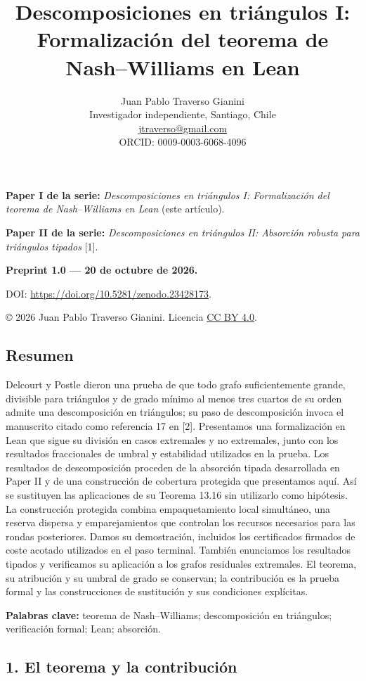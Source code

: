 \documentclass[spanish,11pt,a4paper]{article}
\title{Descomposiciones en triángulos I: Formalización del teorema de Nash–Williams en Lean}
\author{Juan Pablo Traverso Gianini\\
\small Investigador independiente, Santiago, Chile\\
\small \href{mailto:jtraverso@gmail.com}{jtraverso@gmail.com}\\
\small ORCID: 0009-0003-6068-4096}
\date{}
\begin{document}
\raggedbottom
\maketitle
\textbf{Paper I de la serie:} \emph{Descomposiciones en triángulos I: Formalización del teorema de Nash--Williams en Lean} (este artículo).

\textbf{Paper II de la serie:} \emph{Descomposiciones en triángulos II: Absorción robusta para triángulos tipados} {[}1{]}.

\textbf{Preprint 1.0 --- 20 de octubre de 2026.}

DOI: \url{https://doi.org/10.5281/zenodo.23428173}.

© 2026 Juan Pablo Traverso Gianini. Licencia \href{https://creativecommons.org/licenses/by/4.0/}{CC BY 4.0}.

\subsection{Resumen}\label{resumen}

Delcourt y Postle dieron una prueba de que todo grafo suficientemente grande, divisible para triángulos y de grado mínimo al menos tres cuartos de su orden admite una descomposición en triángulos; su paso de descomposición invoca el manuscrito citado como referencia 17 en {[}2{]}. Presentamos una formalización en Lean que sigue su división en casos extremales y no extremales, junto con los resultados fraccionales de umbral y estabilidad utilizados en la prueba. Los resultados de descomposición proceden de la absorción tipada desarrollada en Paper II y de una construcción de cobertura protegida que presentamos aquí. Así se sustituyen las aplicaciones de su Teorema 13.16 sin utilizarlo como hipótesis. La construcción protegida combina empaquetamiento local simultáneo, una reserva dispersa y emparejamientos que controlan los recursos necesarios para las rondas posteriores. Damos su demostración, incluidos los certificados firmados de coste acotado utilizados en el paso terminal. También enunciamos los resultados tipados y verificamos su aplicación a los grafos residuales extremales. El teorema, su atribución y su umbral de grado se conservan; la contribución es la prueba formal y las construcciones de sustitución y sus condiciones explícitas.

\textbf{Palabras clave:} teorema de Nash--Williams; descomposición en triángulos; verificación formal; Lean; absorción.

\subsection{1. El teorema y la contribución}\label{el-teorema-y-la-contribuciuxf3n}
\end{document}
